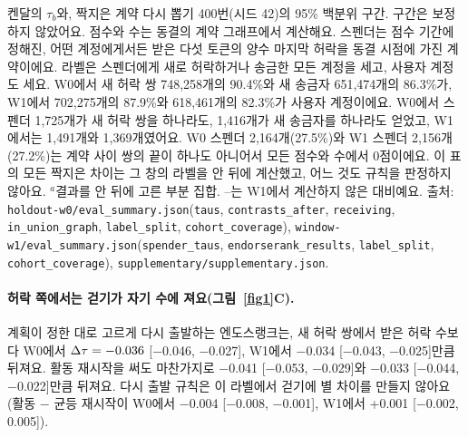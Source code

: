 \begin{table}[!htbp]
\begin{minipage}{\linewidth}\footnotesize\raggedright\vspace{0.4em}
켄달의 $\tau_b$와, 짝지은 계약 다시 뽑기 400번(시드 42)의 95\% 백분위 구간. 구간은 보정하지 않았어요. 점수와 수는 동결의 계약 그래프에서 계산해요. 스펜더는 점수 기간에 정해진, 어떤 계정에게서든 받은 다섯 토큰의 양수 마지막 허락을 동결 시점에 가진 계약이에요. 라벨은 스펜더에게 새로 허락하거나 송금한 모든 계정을 세고, 사용자 계정도 세요. W0에서 새 허락 쌍 748,258개의 90.4\%와 새 송금자 651,474개의 86.3\%가, W1에서 702,275개의 87.9\%와 618,461개의 82.3\%가 사용자 계정이에요. W0에서 스펜더 1,725개가 새 허락 쌍을 하나라도, 1,416개가 새 송금자를 하나라도 얻었고, W1에서는 1,491개와 1,369개였어요. W0 스펜더 2,164개(27.5\%)와 W1 스펜더 2,156개(27.2\%)는 계약 사이 쌍의 끝이 하나도 아니어서 모든 점수와 수에서 0점이에요. 이 표의 모든 짝지은 차이는 그 창의 라벨을 안 뒤에 계산했고, 어느 것도 규칙을 판정하지 않아요. $^{a}$결과를 안 뒤에 고른 부분 집합. --는 W1에서 계산하지 않은 대비예요. 출처: \texttt{holdout-w0/eval\_summary.json}(\texttt{taus}, \texttt{contrasts\_after}, \texttt{receiving}, \texttt{in\_union\_graph}, \texttt{label\_split}, \texttt{cohort\_coverage}), \texttt{window-w1/eval\_summary.json}(\texttt{spender\_taus}, \texttt{endorserank\_results}, \texttt{label\_split}, \texttt{cohort\_coverage}), \texttt{supplementary/supplementary.json}.
\end{minipage}
\end{table}

\paragraph{허락 쪽에서는 걷기가 자기 수에 져요(그림~\ref{fig1}C).}
계획이 정한 대로 고르게 다시 출발하는 엔도스랭크는, 새 허락 쌍에서 받은 허락 수보다 W0에서 $\Delta\tau=-0.036$ [−0.046, −0.027], W1에서 −0.034 [−0.043, −0.025]만큼 뒤져요. 활동 재시작을 써도 마찬가지로 −0.041 [−0.053, −0.029]와 −0.033 [−0.044, −0.022]만큼 뒤져요. 다시 출발 규칙은 이 라벨에서 걷기에 별 차이를 만들지 않아요(활동 − 균등 재시작이 W0에서 −0.004 [−0.008, −0.001], W1에서 +0.001 [−0.002, 0.005]).

